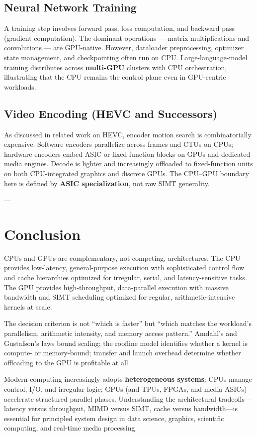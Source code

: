 \documentclass[11pt,journal,onecolumn]{IEEEtran}
\begin{document}
\subsection{Neural Network Training}
A training step involves forward pass, loss computation, and backward pass (gradient computation). The dominant operations --- matrix multiplications and convolutions --- are GPU-native. However, dataloader preprocessing, optimizer state management, and checkpointing often run on CPU. Large-language-model training distributes across \textbf{multi-GPU} clusters with CPU orchestration, illustrating that the CPU remains the control plane even in GPU-centric workloads.

\subsection{Video Encoding (HEVC and Successors)}
As discussed in related work on HEVC, encoder motion search is combinatorially expensive. Software encoders parallelize across frames and CTUs on CPUs; hardware encoders embed ASIC or fixed-function blocks on GPUs and dedicated media engines. Decode is lighter and increasingly offloaded to fixed-function units on both CPU-integrated graphics and discrete GPUs. The CPU--GPU boundary here is defined by \textbf{ASIC specialization}, not raw SIMT generality.

---

\section{Conclusion}
CPUs and GPUs are complementary, not competing, architectures. The CPU provides low-latency, general-purpose execution with sophisticated control flow and cache hierarchies optimized for irregular, serial, and latency-sensitive tasks. The GPU provides high-throughput, data-parallel execution with massive bandwidth and SIMT scheduling optimized for regular, arithmetic-intensive kernels at scale.

The decision criterion is not ``which is faster'' but ``which matches the workload's parallelism, arithmetic intensity, and memory access pattern.'' Amdahl's and Gustafson's laws bound scaling; the roofline model identifies whether a kernel is compute- or memory-bound; transfer and launch overhead determine whether offloading to the GPU is profitable at all.

Modern computing increasingly adopts \textbf{heterogeneous systems}: CPUs manage control, I/O, and irregular logic; GPUs (and TPUs, FPGAs, and media ASICs) accelerate structured parallel phases. Understanding the architectural tradeoffs---latency versus throughput, MIMD versus SIMT, cache versus bandwidth---is essential for principled system design in data science, graphics, scientific computing, and real-time media processing.
\end{document}
